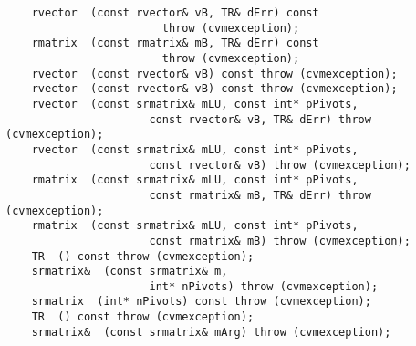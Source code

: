 \verb"    rvector "\verb" (const rvector& vB, TR& dErr) const"\\
\verb"                        throw (cvmexception);"\\
\verb"    rmatrix "\verb" (const rmatrix& mB, TR& dErr) const"\\
\verb"                        throw (cvmexception);"\\
\verb"    rvector "\verb" (const rvector& vB) const throw (cvmexception);"\\
\verb"    rvector "\verb" (const rvector& vB) const throw (cvmexception);"\\
\verb"    rvector "\verb" (const srmatrix& mLU, const int* pPivots,"\\
\verb"                      const rvector& vB, TR& dErr) throw (cvmexception);"\\
\verb"    rvector "\verb" (const srmatrix& mLU, const int* pPivots,"\\
\verb"                      const rvector& vB) throw (cvmexception);"\\
\verb"    rmatrix "\verb" (const srmatrix& mLU, const int* pPivots,"\\
\verb"                      const rmatrix& mB, TR& dErr) throw (cvmexception);"\\
\verb"    rmatrix "\verb" (const srmatrix& mLU, const int* pPivots,"\\
\verb"                      const rmatrix& mB) throw (cvmexception);"\\
\verb"    TR "\verb" () const throw (cvmexception);"\\
\verb"    srmatrix& "\verb" (const srmatrix& m,"\\
\verb"                      int* nPivots) throw (cvmexception);"\\
\verb"    srmatrix "\verb" (int* nPivots) const throw (cvmexception);"\\
\verb"    TR "\verb" () const throw (cvmexception);"\\
\verb"    srmatrix& "\verb" (const srmatrix& mArg) throw (cvmexception);"\\
